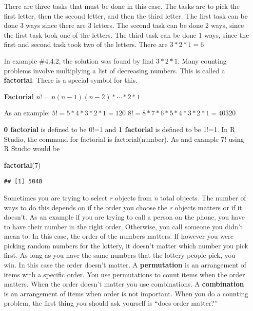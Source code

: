 \documentclass[]{book}
\newenvironment{Shaded}{\begin{snugshade}}{\end{snugshade}}
\newcommand{\DecValTok}[1]{\textcolor[rgb]{0.00,0.00,0.81}{#1}}
\newcommand{\KeywordTok}[1]{\textcolor[rgb]{0.13,0.29,0.53}{\textbf{#1}}}
\newcommand{\NormalTok}[1]{#1}
\begin{document}
There are three tasks that must be done in this case. The tasks are to pick the first letter, then the second letter, and then the third letter. The first task can be done 3 ways since there are 3 letters. The second task can be done 2 ways, since the first task took one of the letters. The third task can be done 1 ways, since the first and second task took two of the letters. There are \(3*2*1=6\)

In example \#4.4.2, the solution was found by find \(3*2*1\). Many counting
problems involve multiplying a list of decreasing numbers. This is
called a \textbf{factorial}. There is a special symbol for this.

\textbf{Factorial}
\(n!=n(n-1)(n-2)*\cdots*2*1\)

As an example:
\(5!=5*4*3*2*1=120\)
\(8!=8*7*6*5*4*3*2*1=40320\)

\textbf{0 factorial} is defined to be 0!=1 and \textbf{1 factorial} is defined to be 1!=1. In R Studio, the command for factorial is factorial(number). As and example 7! using R Studio would be

\begin{Shaded}
\begin{Highlighting}[]
\KeywordTok{factorial}\NormalTok{(}\DecValTok{7}\NormalTok{)}
\end{Highlighting}
\end{Shaded}

\begin{verbatim}
## [1] 5040
\end{verbatim}

Sometimes you are trying to select \emph{r} objects from \emph{n} total objects. The number of ways to do this depends on if the order you choose the \emph{r} objects matters or if it doesn't. As an example if you are trying to call a person on the phone, you have to have their number in the right order. Otherwise, you call someone you didn't mean to. In this case, the order of the numbers matters. If however you were picking random numbers for the lottery, it doesn't matter which number you pick first. As long
as you have the same numbers that the lottery people pick, you win. In this case the order doesn't matter. A \textbf{permutation} is an arrangement of items with a specific order. You use permutations to count items when the order matters. When the order doesn't matter you use combinations. A \textbf{combination} is an arrangement of items when order is not important. When you do a counting problem, the first thing you should ask yourself is ``does order matter?''
\end{document}
